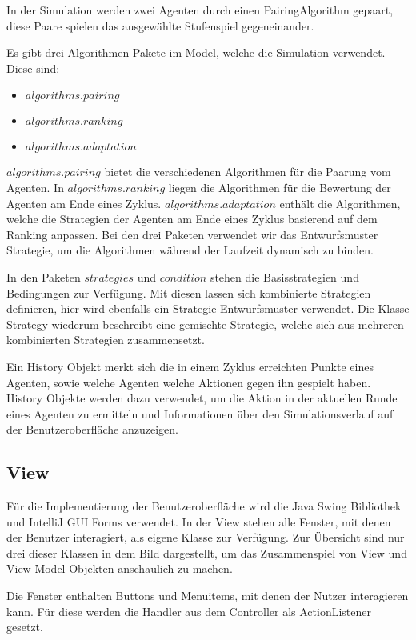 In der Simulation werden zwei Agenten durch einen PairingAlgorithm gepaart, diese Paare spielen das ausgewählte Stufenspiel gegeneinander.

Es gibt drei Algorithmen Pakete im Model, welche die Simulation verwendet. Diese sind: 
\begin{itemize}
\item $algorithms.pairing$
\item $algorithms.ranking$
\item $algorithms.adaptation$
\end{itemize}
$algorithms.pairing$ bietet die verschiedenen Algorithmen für die Paarung vom Agenten. In $algorithms.ranking$ liegen die Algorithmen für die Bewertung der Agenten am Ende eines Zyklus. $algorithms.adaptation$ enthält die Algorithmen, welche die Strategien der Agenten am Ende eines Zyklus basierend auf dem Ranking anpassen. Bei den drei Paketen verwendet wir das Entwurfsmuster Strategie, um die Algorithmen während der Laufzeit dynamisch zu binden.

In den Paketen $strategies$ und $condition$ stehen die Basisstrategien und Bedingungen zur Verfügung. Mit diesen lassen sich kombinierte Strategien definieren, hier wird ebenfalls ein Strategie Entwurfsmuster verwendet. Die Klasse Strategy wiederum beschreibt eine gemischte Strategie, welche sich aus mehreren kombinierten Strategien zusammensetzt.

Ein History Objekt merkt sich die in einem Zyklus erreichten Punkte eines Agenten, sowie welche Agenten welche Aktionen gegen ihn gespielt haben. History Objekte werden dazu verwendet, um die Aktion in der aktuellen Runde eines Agenten zu ermitteln und Informationen über den Simulationsverlauf auf der Benutzeroberfläche anzuzeigen.


\subsection{View}

\noindent
{}

Für die Implementierung der Benutzeroberfläche wird die Java Swing Bibliothek und IntelliJ GUI Forms verwendet. In der View stehen alle Fenster, mit denen der Benutzer interagiert, als eigene Klasse zur Verfügung. Zur Übersicht sind nur drei dieser Klassen in dem Bild dargestellt, um das Zusammenspiel von View und View Model Objekten anschaulich zu machen.

Die Fenster enthalten Buttons und Menuitems, mit denen der Nutzer interagieren kann. Für diese werden die Handler aus dem Controller als ActionListener gesetzt.

